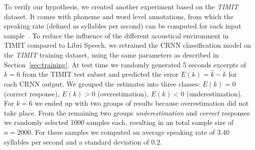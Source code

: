 To verify our hypothesis, we created another experiment based on the \emph{TIMIT} dataset.
It comes with phoneme and word level annotations, from which the speaking rate (defined as syllables per second) can be computed for each input sample~\cite{Jiao16}.
To reduce the influence of the different acoustical environment in TIMIT compared to Libri Speech, we retrained the CRNN classification model on the \emph{TIMIT} training dataset, using the same parameters as described in Section~\ref{sec:training}.
At test time we randomly generated 5 seconds excerpts of \(k=6\) from the TIMIT test subset and predicted the error \(E(k) = \hat{k} - k\) for each CRNN output.
We grouped the estimates into three classes: \(E(k) = 0\) (correct response), \(E(k) > 0\) (overestimation), \(E(k) < 0\) (underestimation).
For \(k=6\) we ended up with two groups of results because overestimation did not take place.
From the remaining two groups \emph{underestimation} and \emph{correct} responses we randomly selected 1000 samples each, resulting in an total sample size of \(n=2000\).
For these samples we computed an average speaking rate of \(3.40\) syllables per second and a standard deviation of \(0.2\).\par


